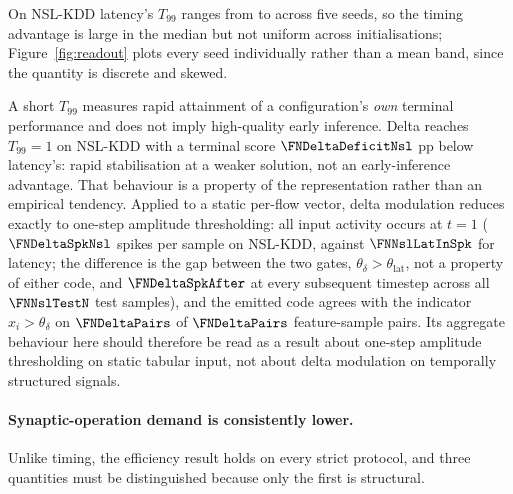 On NSL-KDD latency's $T_{99}$ ranges from \FNTNNNslLatMin{} to
\FNTNNNslLatMax{} across five seeds, so the timing advantage is large in the
median but not uniform across initialisations; Figure~\ref{fig:readout} plots
every seed individually rather than a mean band, since the quantity is discrete
and skewed.

A short $T_{99}$ measures rapid attainment of a configuration's \emph{own}
terminal performance and does not imply high-quality early inference. Delta
reaches $T_{99}=1$ on NSL-KDD with a terminal score $\FNDeltaDeficitNsl$ pp
below latency's: rapid stabilisation at a weaker solution, not an
early-inference advantage. That behaviour is a property of the representation
rather than an empirical tendency. Applied to a static per-flow vector, delta
modulation reduces exactly to one-step amplitude thresholding: all input
activity occurs at $t=1$ ($\FNDeltaSpkNsl$ spikes per sample on NSL-KDD, against
$\FNNslLatInSpk$ for latency; the difference is the gap between the two gates,
$\theta_\delta>\theta_\mathrm{lat}$, not a property of either code, and
$\FNDeltaSpkAfter$ at every subsequent timestep across all
$\FNNslTestN$ test samples), and the emitted code agrees with the indicator
$x_i>\theta_\delta$ on $\FNDeltaPairs$ of $\FNDeltaPairs$ feature-sample pairs.
Its aggregate behaviour here should therefore be read as a result about one-step
amplitude thresholding on static tabular input, not about delta modulation on
temporally structured signals.

\paragraph{Synaptic-operation demand is consistently lower.}
Unlike timing, the efficiency result holds on every strict protocol, and three
quantities must be distinguished because only the first is structural.

